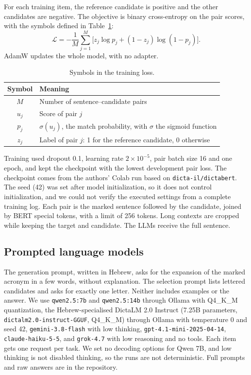 \documentclass[11pt]{article}
\begin{document}
For each training item, the reference candidate is positive and the other candidates are negative. The objective is binary cross-entropy on the pair scores, with the symbols defined in Table~\ref{tab:loss-notation}:
\begin{equation}
\mathcal{L}=-\frac{1}{M}\sum_{j=1}^{M}\big[z_j\log p_j+(1-z_j)\log(1-p_j)\big].
\end{equation}
AdamW updates the whole model, with no adapter.

\begin{table}[t]
\centering\small
\begin{tabular}{@{}cp{}@{}}
\toprule
Symbol & Meaning \\
\midrule
$M$ & Number of sentence--candidate pairs \\
$u_j$ & Score of pair $j$ \\
$p_j$ & $\sigma(u_j)$, the match probability, with $\sigma$ the sigmoid function \\
$z_j$ & Label of pair $j$: 1 for the reference candidate, 0 otherwise \\
\bottomrule
\end{tabular}
\caption{Symbols in the training loss.}
\label{tab:loss-notation}
\end{table}

Training used dropout 0.1, learning rate $2\times10^{-5}$, pair batch size 16 and one epoch, and kept the checkpoint with the lowest development pair loss. The checkpoint comes from the authors' Colab run based on \texttt{dicta-il/dictabert}. The seed (42) was set after model initialization, so it does not control initialization, and we could not verify the executed settings from a complete training log. Each pair is the marked sentence followed by the candidate, joined by BERT special tokens, with a limit of 256 tokens. Long contexts are cropped while keeping the target and candidate. The LLMs receive the full sentence.

\subsection{Prompted language models}
The generation prompt, written in Hebrew, asks for the expansion of the marked acronym in a few words, without explanation. The selection prompt lists lettered candidates and asks for exactly one letter. Neither includes examples or the answer. We use \texttt{qwen2.5:7b} and \texttt{qwen2.5:14b} \citep{qwen2025technical} through Ollama with Q4\_K\_M quantization, the Hebrew-specialised DictaLM 2.0 Instruct \citep{shmidman2024dictalm} (7.25B parameters, \texttt{dictalm2.0-instruct-GGUF}, Q4\_K\_M) through Ollama with temperature 0 and seed 42,
\texttt{gemini-3.8-flash} with low thinking, \texttt{gpt-4.1-mini-2025-04-14}, \texttt{claude-haiku-5-5}, and \texttt{grok-4.7} with low reasoning and no tools. Each item gets one request per task. We set no decoding options for Qwen 7B, and low thinking is not disabled thinking, so the runs are not deterministic. Full prompts and raw answers are in the repository.
\end{document}
